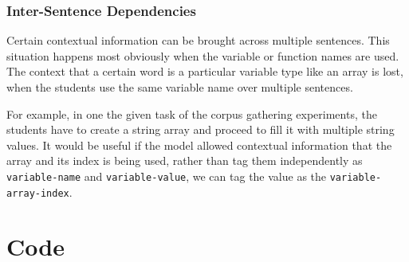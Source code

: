 \documentclass[fyp]{socreport}
\begin{document}
\subsection{Inter-Sentence Dependencies}
Certain contextual information can be brought across multiple sentences. This
situation happens most obviously when the variable or function names are used.
The context that a certain word is a particular variable type like an array is
lost, when the students use the same variable name over multiple sentences.

For example, in one the given task of the corpus gathering experiments, the
students have to create a string array and proceed to fill it with multiple
string values. It would be useful if the model allowed contextual information
that the array and its index is being used, rather than tag them independently
as \texttt{variable-name} and \texttt{variable-value}, we can tag the value as
the \texttt{variable-array-index}.


\printbibliography[title={Whole bibliography}]

\appendix
\chapter{Code}
\end{document}
